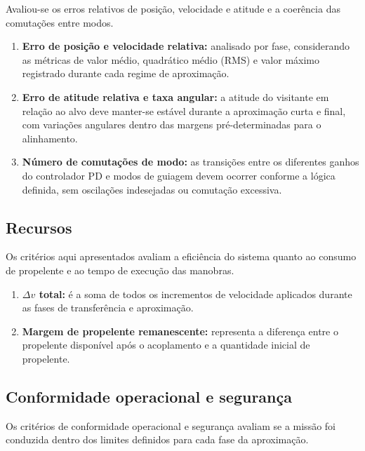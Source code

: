 Avaliou-se os erros relativos de posição, velocidade e atitude e a coerência das comutações entre modos.

\begin{enumerate}[label=(\roman*), leftmargin=*, itemsep=0pt]
\item \textbf{Erro de posição e velocidade relativa:} analisado por fase, considerando as métricas de valor médio, quadrático médio (RMS) e valor máximo registrado durante cada regime de aproximação.

\item \textbf{Erro de atitude relativa e taxa angular:} a atitude do visitante em relação ao alvo deve manter-se estável durante a aproximação curta e final, com variações angulares dentro das margens pré-determinadas para o alinhamento.

\item \textbf{Número de comutações de modo:} as transições entre os diferentes ganhos do controlador PD e modos de guiagem devem ocorrer conforme a lógica definida, sem oscilações indesejadas ou comutação excessiva.
\end{enumerate}

\subsection{Recursos}

Os critérios aqui apresentados avaliam a eficiência do sistema quanto ao consumo de propelente e ao tempo de execução das manobras.

\begin{enumerate}[label=(\roman*), leftmargin=*, itemsep=0pt]
\item \textbf{$\Delta v$ total:} é a soma de todos os incrementos de velocidade aplicados durante as fases de transferência e aproximação.

\item \textbf{Margem de propelente remanescente:} representa a diferença entre o propelente disponível após o acoplamento e a quantidade inicial de propelente.
\end{enumerate}

\subsection{Conformidade operacional e segurança}

Os critérios de conformidade operacional e segurança avaliam se a missão foi conduzida dentro dos limites definidos para cada fase da aproximação.

